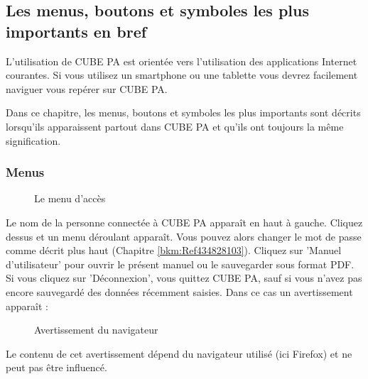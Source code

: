 \subsection{Les menus, boutons et symboles les plus importants en bref}

L'utilisation de CUBE PA est orientée vers l'utilisation des applications Internet courantes. Si vous utilisez un smartphone ou une tablette vous devrez facilement naviguer vous repérer sur CUBE PA.

\vspace{\baselineskip}

Dans ce chapitre, les menus, boutons et symboles les plus importants sont décrits lorsqu'ils apparaissent partout dans CUBE PA et qu'ils ont toujours la même signification.

\pagebreak

\subsubsection{Menus}

\begin{figure}[H]
\caption{Le menu d'accès}
\end{figure}

Le nom de la personne connectée à CUBE PA apparaît en haut à gauche. Cliquez dessus et un menu déroulant apparaît. Vous pouvez alors changer le mot de passe comme décrit plus haut (Chapitre \ref{bkm:Ref434828103}). Cliquez sur 'Manuel d'utilisateur' pour ouvrir le présent manuel ou le sauvegarder sous format PDF. Si vous cliquez sur 'Déconnexion', vous quittez CUBE PA, sauf si vous n'avez pas encore sauvegardé des données récemment saisies. Dans ce cas un avertissement apparaît :

\begin{figure}[H]
\caption{Avertissement du navigateur}
\end{figure}
\begin{small}
Le contenu de cet avertissement dépend du navigateur utilisé (ici Firefox) et ne peut pas être influencé.
\end{small}

